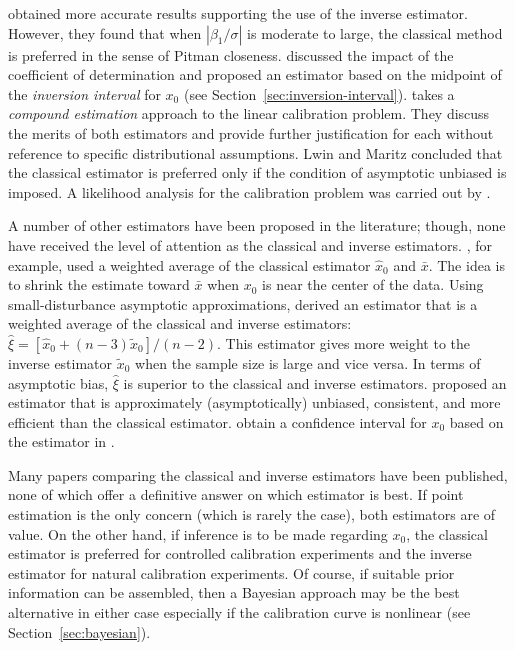 \documentclass[cmfont,usenames,dvipsnames,leqno]{afit-etd}\usepackage[]{graphicx}\usepackage[]{color}
\newcommand{\wh}[1]{\ensuremath{\widehat{#1}}}
\newcommand{\wt}[1]{\ensuremath{\widetilde{#1}}}
\begin{document}
\citet{kannan_comparison_2007} obtained more accurate results supporting the use of the inverse estimator. However, they found that when $|\beta_1/\sigma|$ is moderate to large, the classical method is preferred in the sense of Pitman closeness. \citet{ali_calibration_2002} discussed the impact of the coefficient of determination and proposed an estimator based on the midpoint of the \textit{inversion interval} for $x_0$ (see Section~\ref{sec:inversion-interval}). \citet{lwin_analysis_1982} takes a \textit{compound estimation} approach to the linear calibration problem. They discuss the merits of both estimators and provide further justification for each without reference to specific distributional assumptions. Lwin and Maritz concluded that the classical estimator is preferred only if the condition of asymptotic unbiased is imposed. A likelihood analysis for the calibration problem was carried out by \citet{minder_likelihood_1975}. 

A number of other estimators have been proposed in the literature; though, none have received the level of attention as the classical and inverse estimators. \citet{ali-alternative-1981}, for example, used a weighted average of the classical estimator $\wh{x}_0$ and $\bar{x}$. The idea is to shrink the estimate toward $\bar{x}$ when $x_0$ is near the center of the data. Using small-disturbance asymptotic approximations, \citet{srivastava-small-1989} derived an estimator that is a weighted average of the classical and inverse estimators: $\wh{\xi} = [\wh{x}_0 + (n-3)\wt{x}_0]/(n-2)$. This estimator gives more weight to the inverse estimator $\wt{x}_0$ when the sample size is large and vice versa. In terms of asymptotic bias, $\wh{\xi}$ is superior to the classical and inverse estimators. \citet{naszodi_elimination_1978} proposed an estimator that is approximately (asymptotically) unbiased, consistent, and more efficient than the classical estimator. \citet{dahiya-modified-1991} obtain a confidence interval for $x_0$ based on the estimator in \citet{naszodi_elimination_1978}. 

Many papers comparing the classical and inverse estimators have been published, none of which offer a definitive answer on which estimator is best. If point estimation is the only concern (which is rarely the case), both estimators are of value. On the other hand, if inference is to be made regarding $x_0$, the classical estimator is preferred for controlled calibration experiments and the inverse estimator for natural calibration experiments. Of course, if suitable prior information can be assembled, then a Bayesian approach may be the best alternative in either case especially if the calibration curve is nonlinear (see Section~\ref{sec:bayesian}). 
\end{document}
